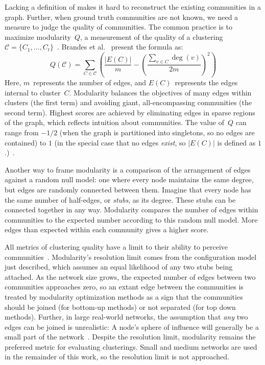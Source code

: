 Lacking a definition of  makes it hard to reconstruct the existing communities in a graph. Further, when ground truth communities are not known, we need a measure to judge the quality of communities. The common practice is to maximize modularity~$Q$, a measurement of the quality of a clustering~$\mathcal{C} = \{C_1, \ldots, C_t\}$~\cite{newman2006modularity}. Brandes et al.~\cite{brandes2007finding}
present the formula as:
\begin{equation}
Q (\mathcal{C}) = \sum_{C \in \mathcal{C}} \left( \frac{| E(C) |}{m} -  \left( \frac{\sum_{v \in C} \deg(v)}{2m} \right) ^2 \right)
\label{eqn: modularity}
\end{equation}
Here, $m$~represents the number of edges, and $E(C)$~represents the edges internal to cluster~$C$. Modularity balances the objectives of many edges within clusters (the first term) and avoiding giant, all-encompassing communities (the second term). Highest scores are achieved by eliminating edges in sparse regions of the graph, which reflects intuition about communities. The value of~$Q$ can range from $-1/2$ (when the graph is partitioned into singletons, so no edges are contained) to $1$ (in the special case that no edges \emph{exist}, so $|E(C)|$ is defined as $1$.)~\cite{brandes2007finding}.

Another way to frame modularity is a comparison of the arrangement of edges against a random null model: one where every node maintains the same degree, but edges are randomly connected between them. Imagine that every node has the same number of half-edges, or \emph{stubs}, as its degree. These stubs can be connected together in any way. Modularity compares the number of edges within communities to the expected number according to this random null model. More edges than expected within each community gives a higher score.

All metrics of clustering quality have a limit to their ability to perceive communities~\cite{fortunato2007resolution}. Modularity's resolution limit comes from the configuration model just described, which assumes an equal likelihood of any two stubs being attached. As the network size grows, the expected number of edges between two communities approaches zero, so an extant edge between the communities is treated by modularity optimization methods as a sign that the communities should be joined (for bottom-up methods) or not separated (for top down methods). Further, in large real-world networks, the assumption that \emph{any} two edges can be joined is unrealistic: A node's sphere of influence will generally be a small part of the network~\cite{fortunato2007resolution, good2010performance}. Despite the resolution limit, modularity remains the preferred metric for evaluating clusterings. Small and medium networks are used in the remainder of this work, so the resolution limit is not approached.

